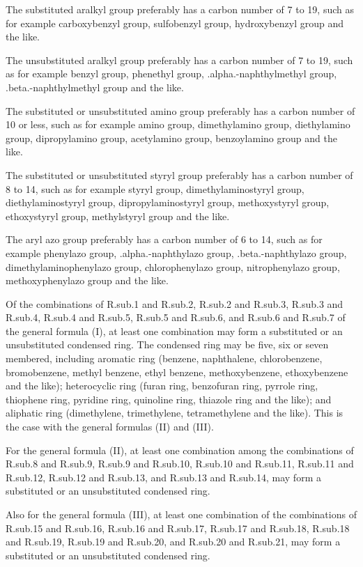 \documentclass[11pt,a4paper]{article}
\begin{document}
The substituted aralkyl group preferably has a carbon number of 7 to 19, such as for example carboxybenzyl group, sulfobenzyl group, hydroxybenzyl group and the like.

The unsubstituted aralkyl group preferably has a carbon number of 7 to 19, such as for example benzyl group, phenethyl group, .alpha.-naphthylmethyl group, .beta.-naphthylmethyl group and the like.

The substituted or unsubstituted amino group preferably has a carbon number of 10 or less, such as for example amino group, dimethylamino group, diethylamino group, dipropylamino group, acetylamino group, benzoylamino group and the like.

The substituted or unsubstituted styryl group preferably has a carbon number of 8 to 14, such as for example styryl group, dimethylaminostyryl group, diethylaminostyryl group, dipropylaminostyryl group, methoxystyryl group, ethoxystyryl group, methylstyryl group and the like.

The aryl azo group preferably has a carbon number of 6 to 14, such as for example phenylazo group, .alpha.-naphthylazo group, .beta.-naphthylazo group, dimethylaminophenylazo group, chlorophenylazo group, nitrophenylazo group, methoxyphenylazo group and the like.

Of the combinations of R.sub.1 and R.sub.2, R.sub.2 and R.sub.3, R.sub.3 and R.sub.4, R.sub.4 and R.sub.5, R.sub.5 and R.sub.6, and R.sub.6 and R.sub.7 of the general formula (I), at least one combination may form a substituted or an unsubstituted condensed ring. The condensed ring may be five, six or seven membered, including aromatic ring (benzene, naphthalene, chlorobenzene, bromobenzene, methyl benzene, ethyl benzene, methoxybenzene, ethoxybenzene and the like); heterocyclic ring (furan ring, benzofuran ring, pyrrole ring, thiophene ring, pyridine ring, quinoline ring, thiazole ring and the like); and aliphatic ring (dimethylene, trimethylene, tetramethylene and the like). This is the case with the general formulas (II) and (III).

For the general formula (II), at least one combination among the combinations of R.sub.8 and R.sub.9, R.sub.9 and R.sub.10, R.sub.10 and R.sub.11, R.sub.11 and R.sub.12, R.sub.12 and R.sub.13, and R.sub.13 and R.sub.14, may form a substituted or an unsubstituted condensed ring.

Also for the general formula (III), at least one combination of the combinations of R.sub.15 and R.sub.16, R.sub.16 and R.sub.17, R.sub.17 and R.sub.18, R.sub.18 and R.sub.19, R.sub.19 and R.sub.20, and R.sub.20 and R.sub.21, may form a substituted or an unsubstituted condensed ring.
\end{document}
